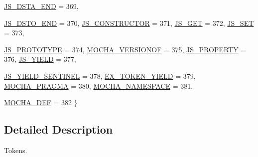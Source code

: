\begin{DoxyCompactItemize}
\hyperlink{structyy_1_1_parser_implementation_1_1token_aadf9ae7281b1272b27ee431a11ede892a5c0e71f73ec4726cfbea10efd00a299e}{JS\_\-DSTA\_\-END} =  369, 
\par
\hyperlink{structyy_1_1_parser_implementation_1_1token_aadf9ae7281b1272b27ee431a11ede892a35cbdac67623f5f4c89215a183e8fa85}{JS\_\-DSTO\_\-END} =  370, 
\hyperlink{structyy_1_1_parser_implementation_1_1token_aadf9ae7281b1272b27ee431a11ede892aa26a07601e89d6f81db7e62c29eb2db2}{JS\_\-CONSTRUCTOR} =  371, 
\hyperlink{structyy_1_1_parser_implementation_1_1token_aadf9ae7281b1272b27ee431a11ede892ac93a994e401005f59e7f69f089c94759}{JS\_\-GET} =  372, 
\hyperlink{structyy_1_1_parser_implementation_1_1token_aadf9ae7281b1272b27ee431a11ede892a65a44e5652ef1f3b57539374dc87681b}{JS\_\-SET} =  373, 
\par
\hyperlink{structyy_1_1_parser_implementation_1_1token_aadf9ae7281b1272b27ee431a11ede892aec6847e24b023d05091ed0984509299d}{JS\_\-PROTOTYPE} =  374, 
\hyperlink{structyy_1_1_parser_implementation_1_1token_aadf9ae7281b1272b27ee431a11ede892a1bcd61aa1aa5f4dbb48f3098fa3f2b3d}{MOCHA\_\-VERSIONOF} =  375, 
\hyperlink{structyy_1_1_parser_implementation_1_1token_aadf9ae7281b1272b27ee431a11ede892aabcc7553280f59d64f8f5748d2d3c8c4}{JS\_\-PROPERTY} =  376, 
\hyperlink{structyy_1_1_parser_implementation_1_1token_aadf9ae7281b1272b27ee431a11ede892a1af22de85035a649ceac781c234a0a64}{JS\_\-YIELD} =  377, 
\par
\hyperlink{structyy_1_1_parser_implementation_1_1token_aadf9ae7281b1272b27ee431a11ede892aec16288a11944048831d419fb375c74b}{JS\_\-YIELD\_\-SENTINEL} =  378, 
\hyperlink{structyy_1_1_parser_implementation_1_1token_aadf9ae7281b1272b27ee431a11ede892a63905b927369beaef51c258636cf98dc}{EX\_\-TOKEN\_\-YIELD} =  379, 
\hyperlink{structyy_1_1_parser_implementation_1_1token_aadf9ae7281b1272b27ee431a11ede892ab486b5b20adcf9ba1d99a469fee48e1e}{MOCHA\_\-PRAGMA} =  380, 
\hyperlink{structyy_1_1_parser_implementation_1_1token_aadf9ae7281b1272b27ee431a11ede892a6d7cb79b7c46f0ed9a4bd6ce2c3afd81}{MOCHA\_\-NAMESPACE} =  381, 
\par
\hyperlink{structyy_1_1_parser_implementation_1_1token_aadf9ae7281b1272b27ee431a11ede892a7a83d53057e89577cbee371dd441bfa4}{MOCHA\_\-DEF} =  382
 \}
\end{DoxyCompactItemize}


\subsection{Detailed Description}
Tokens. 

